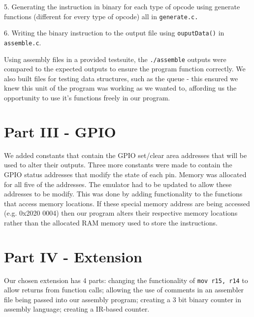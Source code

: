 \documentclass[11pt]{article}
\begin{document}
5. Generating the instruction in binary for each type of opcode using generate
functions (different for every type of opcode) all in \texttt{generate.c.}\newline

6. Writing the binary instruction to the output file using \verb|ouputData()| in \texttt{assemble.c}.\newline

Using assembly files in a provided testsuite, the \texttt{./assemble} outputs were compared to the expected outputs to ensure the program function correctly. We also built files for testing data structures, such as the queue - this ensured we knew this unit of the program was working as we wanted to, affording us the opportunity to use it's functions freely in our program.

\section{Part III - GPIO}

We added constants that contain the GPIO set/clear area addresses that will be used to alter their outputs. Three more constants were made to contain the GPIO status addresses that modify the state of each pin.  Memory was allocated for all five of the addresses. The emulator had to be updated to allow these addresses to be modify. This was done by adding functionality to the functions that access memory locations. If these special memory address are being accessed (e.g. 0x2020 0004) then our program alters their respective memory locations rather than the allocated RAM memory used to store the instructions.

\section{Part IV - Extension}
Our chosen extension has 4 parts: changing the functionality of \texttt{mov r15, r14} to allow returns from function calls; allowing the use of comments in an assembler file being passed into our assembly program; creating a 3 bit binary counter in assembly language; creating a IR-based counter. \newline


\end{document}
